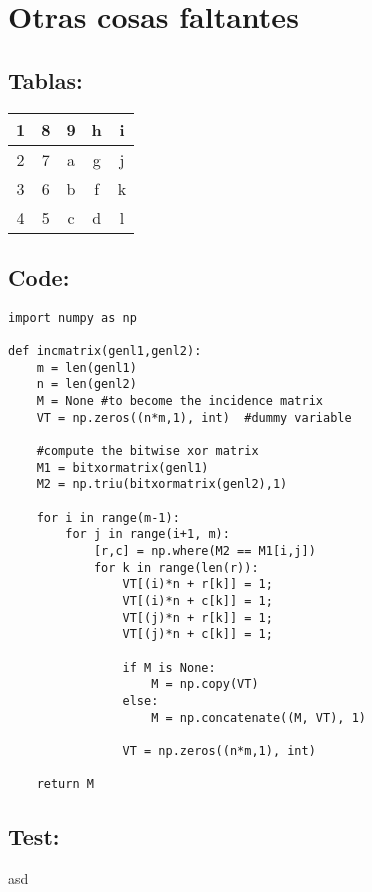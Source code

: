 \documentclass{article}
\begin{document}
\section{Otras cosas faltantes}
\subsection{Tablas:}
\begin{tabular}{c || c |c | c |c}
1 & 8 & 9 & h & i \\ \hline
2 & 7 & a & g & j \\ \hline
3 & 6 & b & f & k \\ \hline
4 & 5 & c & d & l
\end{tabular}
\subsection{Code:}

\begin{lstlisting}
import numpy as np

def incmatrix(genl1,genl2):
    m = len(genl1)
    n = len(genl2)
    M = None #to become the incidence matrix
    VT = np.zeros((n*m,1), int)  #dummy variable

    #compute the bitwise xor matrix
    M1 = bitxormatrix(genl1)
    M2 = np.triu(bitxormatrix(genl2),1)

    for i in range(m-1):
        for j in range(i+1, m):
            [r,c] = np.where(M2 == M1[i,j])
            for k in range(len(r)):
                VT[(i)*n + r[k]] = 1;
                VT[(i)*n + c[k]] = 1;
                VT[(j)*n + r[k]] = 1;
                VT[(j)*n + c[k]] = 1;

                if M is None:
                    M = np.copy(VT)
                else:
                    M = np.concatenate((M, VT), 1)

                VT = np.zeros((n*m,1), int)

    return M
\end{lstlisting}

\subsection{Test:}
asd
\end{document}
